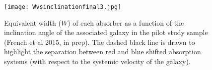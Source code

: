 \documentclass[iop]{emulateapj-rtx4}
\begin{document}
\begin{figure}[h!]
        \centering
        \vspace{-10pt}
        \texttt{[image: Wvsinclinationfinal3.jpg]}
        \caption{\small{Equivalent width ($W$) of each absorber as a function of the inclination angle of the associated galaxy in the pilot study sample (French et al 2015, in prep). The dashed black line is drawn to highlight the separation between red and blue shifted absorption systems (with respect to the systemic velocity of the galaxy).}}
        \label{dichotomy}
\end{figure} 




%
%




\vspace{10pt}
\end{document}
